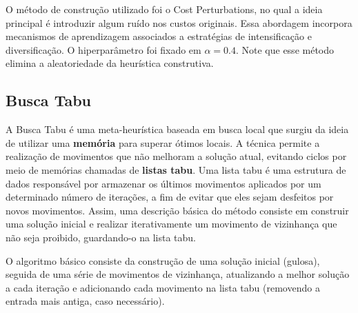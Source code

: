 \documentclass{MO824}
\begin{document}

O método de construção utilizado foi o Cost Perturbations, no qual a ideia principal é introduzir algum ruído nos custos originais. Essa abordagem incorpora mecanismos de aprendizagem associados a estratégias de intensificação e diversificação. O hiperparâmetro foi fixado em $\alpha=0.4$. Note que esse método elimina a aleatoriedade da heurística construtiva.

\subsection{Busca Tabu} \label{tabu}
A Busca Tabu é uma meta-heurística baseada em busca local que surgiu da ideia de utilizar uma \textbf{memória} para superar ótimos locais. A técnica permite a realização de movimentos que não melhoram a solução atual, evitando ciclos por meio de memórias chamadas de \textbf{listas tabu}. Uma lista tabu é uma estrutura de dados responsável por armazenar os últimos movimentos aplicados por um determinado número de iterações, a fim de evitar que eles sejam desfeitos por novos movimentos. Assim, uma descrição básica do método consiste em construir uma solução inicial e realizar iterativamente um movimento de vizinhança que não seja proibido, guardando-o na lista tabu.

O algoritmo básico consiste da construção de uma solução inicial (gulosa), seguida de uma série de movimentos de vizinhança, atualizando a melhor solução a cada iteração e adicionando cada movimento na lista tabu (removendo a entrada mais antiga, caso necessário).
\end{document}
